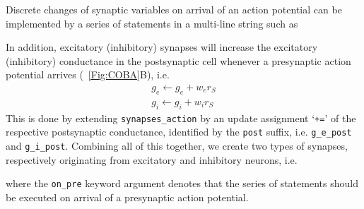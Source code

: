 \documentclass[a4paper, 11pt]{article}
\newcommand*{\figref}[1]{\figurename~\ref{#1}}
\begin{document}
Discrete changes of synaptic variables on arrival of an action potential can be implemented by a series of statements in a multi-line string such as

In addition, excitatory (inhibitory) synapses will increase the excitatory (inhibitory) conductance in the postsynaptic cell whenever a presynaptic action potential arrives (\figref{Fig:COBA}B), i.e.
\begin{align}
	g_e \leftarrow g_e + w_e r_S\\
	g_i \leftarrow g_i + w_i r_S
\end{align}
This is done by extending \lstinline|synapses_action| by an update assignment `\lstinline|+=|' of the respective postsynaptic conductance, identified by the \lstinline|post| suffix, i.e. \lstinline|g_e_post| and \lstinline|g_i_post|.
Combining all of this together, we create two types of synapses, respectively originating from excitatory and inhibitory neurons, i.e.

where the \lstinline|on_pre| keyword argument denotes that the series of statements should be executed on arrival of a presynaptic action potential.
\end{document}
